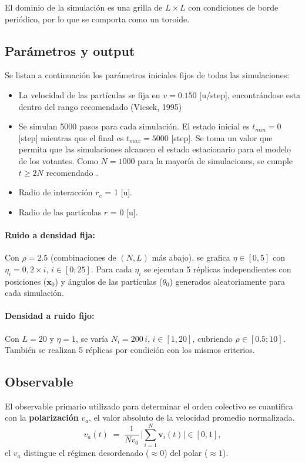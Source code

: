 \documentclass{article}
\begin{document}
El dominio de la simulación es una grilla de \(L\times L\) con condiciones de borde periódico, por lo que se comporta como un toroide.

\subsection{Parámetros y output}

Se listan a continuación los parámetros iniciales fijos de todas  las simulaciones:

\begin{itemize}
    \item La velocidad de las partículas se fija en \( v = 0.150 \) [u/step], encontrándose esta dentro del rango recomendado (Vicsek, 1995)
    \item Se simulan 5000 pasos para cada simulación. El estado inicial es  \( t_{min} = 0\) [step] mientras que el final es  \(t_{max} = 5000\) [step]. Se toma un valor que permita que las simulaciones alcancen el estado estacionario para el modelo de los votantes. Como \(N = 1000\) para la mayoría de simulaciones, se cumple \(t \geq 2N \) recomendado  \cite{baglietto2018}. 
    \item Radio de interacción \(r_c\) = 1 [u]. 
    \item Radio de las partículas \(r\) = 0 [u]. 
\end{itemize}

\paragraph{Ruido a densidad fija:} Con \(\rho=2.5\) (combinaciones de \((N,L)\) más abajo), se grafica \(\eta\in[0,5]\) con \(\eta_i=0,2\times i\), \(i\in[0;25]\). Para cada \(\eta_i\) se ejecutan 5 réplicas independientes con posiciones (\(\mathbf x_0\)) y ángulos de las partículas (\( \theta_0\)) generados aleatoriamente para cada simulación.

\paragraph{Densidad a ruido fijo:} Con \(L=20\) y \(\eta=1\), se varía \(N_i=200\,i\), \(i \in [1,20]\), cubriendo \(\rho\in[0.5;10]\). También se realizan 5 réplicas por condición con los mismos criterios.


\subsection{Observable}
El observable primario utilizado para determinar el orden colectivo se cuantifica con la \textbf{polarización} \(v_a\), el valor absoluto de la velocidad promedio normalizada.
\[
v_a(t) \;=\; \frac{1}{N v_0}\,\Big|\sum_{i=1}^N \mathbf v_i(t)\Big|\in[0,1],
\]
el \(v_a\) distingue el régimen desordenado (\(\approx 0\)) del polar (\(\approx 1\)). 
\end{document}
